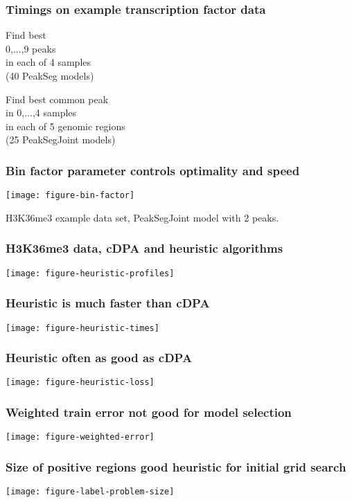 \documentclass{beamer}
\begin{document}
\begin{frame}
  \frametitle{Timings on example transcription factor data}

  \scriptsize

  Find best \\
  0,...,9 peaks\\
  in each of 4 samples\\
  (40 PeakSeg models)

  

  \vskip 0.2cm

  Find best common peak\\
  in 0,...,4 samples\\
  in each of 5 genomic regions\\
  (25 PeakSegJoint models)

  

\end{frame}

\begin{frame}
  \frametitle{Bin factor parameter controls optimality and speed}
  \texttt{[image: figure-bin-factor]}

  H3K36me3 example data set, PeakSegJoint model with 2 peaks.
\end{frame}

\begin{frame}
  \frametitle{H3K36me3 data, cDPA and heuristic algorithms}

  \texttt{[image: figure-heuristic-profiles]}
\end{frame}

\begin{frame}
  \frametitle{Heuristic is much faster than cDPA}

  \texttt{[image: figure-heuristic-times]}
\end{frame}

\begin{frame}
  \frametitle{Heuristic often as good as cDPA}

  \texttt{[image: figure-heuristic-loss]}
\end{frame}


\begin{frame}
  \frametitle{Weighted train error not good for model selection}

  \texttt{[image: figure-weighted-error]}
\end{frame}

\begin{frame}
  \frametitle{Size of positive regions good heuristic for initial grid search}

  \texttt{[image: figure-label-problem-size]}
\end{frame}
\end{document}
